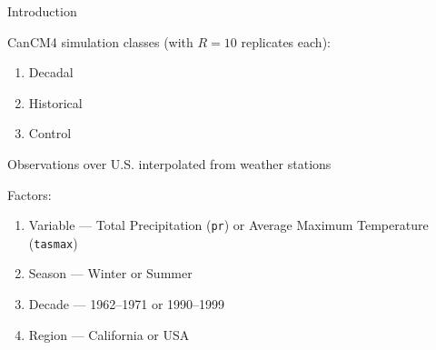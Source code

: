\documentclass[mathserif, 11pt, t]{beamer}
\begin{document}



\begin{frame}{Introduction}

CanCM4 simulation classes (with $R=10$ replicates each):
\begin{enumerate}
\item Decadal
\item Historical
\item Control
\end{enumerate}
\bigskip

Observations over U.S. interpolated from weather stations
\bigskip

Factors:
\begin{enumerate}
\item Variable --- Total Precipitation (\texttt{pr}) or Average Maximum Temperature (\texttt{tasmax})
\item Season --- Winter or Summer
\item Decade --- 1962--1971 or 1990--1999
\item Region --- California or USA
\end{enumerate}

\end{frame}
\end{document}
